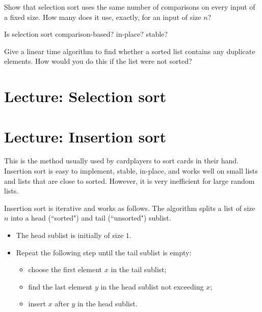 \begin{Exercise}\label{exr:selectionsort}
Show that selection sort uses the same number of comparisons on every input of 
a fixed size. How many does it use, exactly, for an input of size $n$? 
\end{Exercise}

\begin{Exercise}\label{exr:selsort-attributes}
Is selection sort comparison-based? in-place? stable?
\end{Exercise}

\begin{Exercise}\label{exr:find-duplicates}
Give a linear time algorithm to find whether a sorted list contains any 
duplicate elements. How would you do this if the list were not 
sorted?
\end{Exercise}

\chapter{Lecture: Selection sort} \label{sec:selectionsort}

\chapter{Lecture: Insertion sort} \label{sec:insertionsort}
This is the method usually used by cardplayers to sort cards in their hand. 
Insertion sort is easy to implement, stable, in-place, and works well on small 
lists and lists that are close to sorted. However, it is very inefficient for 
large random lists.

Insertion sort is iterative and works as follows. The algorithm splits a list 
of size \(n\) into a head (``sorted") and tail (``unsorted") sublist.

\begin{itemize}
\item The head sublist is initially of size $1$. 
\item Repeat the following step until the tail sublist is empty:
\begin{itemize}
\item choose the first element $x$ in the tail sublist;
\item find the last element $y$ in the head sublist not exceeding $x$;
\item insert $x$ after $y$ in the head sublist.
\end{itemize}
\end{itemize}

